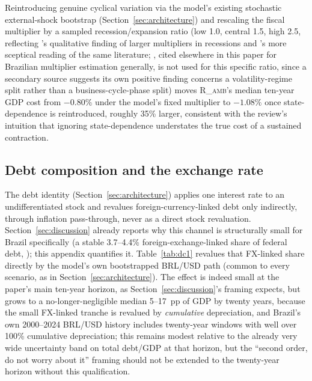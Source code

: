 \documentclass[11pt,a4paper]{article}
\begin{document}
Reintroducing genuine cyclical variation via the model's existing stochastic external-shock bootstrap (Section~\ref{sec:architecture}) and rescaling the fiscal multiplier by a sampled recession/expansion ratio (low 1.0, central 1.5, high 2.5, reflecting \citet{auerbachgorodnichenko2012}'s qualitative finding of larger multipliers in recessions and \citet{ramey2019,rameyzubairy2018}'s more sceptical reading of the same literature; \citet{pires2014}, cited elsewhere in this paper for Brazilian multiplier estimation generally, is not used for this specific ratio, since a secondary source suggests its own positive finding concerns a volatility-regime split rather than a business-cycle-phase split) moves \textsc{R\_amb}'s median ten-year GDP cost from $-0.80\%$ under the model's fixed multiplier to $-1.08\%$ once state-dependence is reintroduced, roughly 35\% larger, consistent with the review's intuition that ignoring state-dependence understates the true cost of a sustained contraction.

\subsection{Debt composition and the exchange rate}

The debt identity (Section~\ref{sec:architecture}) applies one interest rate to an undifferentiated stock and revalues foreign-currency-linked debt only indirectly, through inflation pass-through, never as a direct stock revaluation. Section~\ref{sec:discussion} already reports why this channel is structurally small for Brazil specifically (a stable 3.7--4.4\% foreign-exchange-linked share of federal debt, \citealp{tesourormd2026}); this appendix quantifies it. Table~\ref{tab:dc1} revalues that FX-linked share directly by the model's own bootstrapped BRL/USD path (common to every scenario, as in Section~\ref{sec:architecture}). The effect is indeed small at the paper's main ten-year horizon, as Section~\ref{sec:discussion}'s framing expects, but grows to a no-longer-negligible median 5--17~pp of GDP by twenty years, because the small FX-linked tranche is revalued by \emph{cumulative} depreciation, and Brazil's own 2000--2024 BRL/USD history includes twenty-year windows with well over 100\% cumulative depreciation; this remains modest relative to the already very wide uncertainty band on total debt/GDP at that horizon, but the ``second order, do not worry about it'' framing should not be extended to the twenty-year horizon without this qualification.
\end{document}
